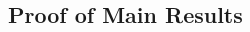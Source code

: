 \documentclass[aos]{imsart}
\theoremstyle{plain}
\theoremstyle{definition}
\theoremstyle{remark}
\begin{document}
\begin{CJK}{UTF8}{gbsn}




\newpage



\newpage

\begin{appendix}

\section{Proof of Main Results}
\label{sec:main_proof}


\end{appendix}
\end{CJK}
\end{document}

